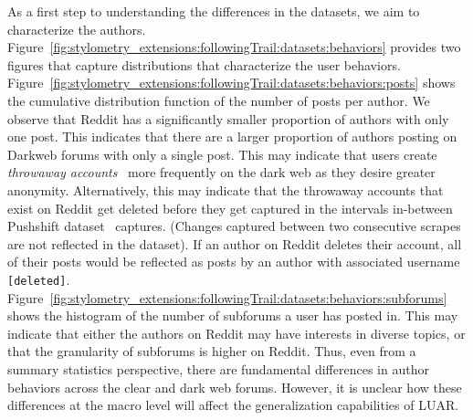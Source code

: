 As a first step to understanding the differences in the datasets, we aim to characterize the authors.
Figure~\ref{fig:stylometry_extensions:followingTrail:datasets:behaviors} provides two figures that capture distributions that characterize the user behaviors.
Figure~\ref{fig:stylometry_extensions:followingTrail:datasets:behaviors:posts} shows the cumulative distribution function of the number of posts per author.
We observe that Reddit has a significantly smaller proportion of authors with only one post.
This indicates that there are a larger proportion of authors posting on Darkweb forums with only a single post.
This may indicate that users create \textit{throwaway accounts}~\cite{leavitt2015throwaway} more frequently on the dark web as they desire greater anonymity.
Alternatively, this may indicate that the throwaway accounts that exist on Reddit get deleted before they get captured in the intervals in-between Pushshift dataset~\citep{baumgartner2020pushshift} captures.
(Changes captured between two consecutive scrapes are not reflected in the dataset).
If an author on Reddit deletes their account, all of their posts would be reflected as posts by an author with associated username \texttt{[deleted]}.
Figure~\ref{fig:stylometry_extensions:followingTrail:datasets:behaviors:subforums} shows the histogram of the number of subforums a user has posted in.
This may indicate that either the authors on Reddit may have interests in diverse topics, or that the granularity of subforums is higher on Reddit.
Thus, even from a summary statistics perspective, there are fundamental differences in author behaviors across the clear and dark web forums.
However, it is unclear how these differences at the macro level will affect the generalization capabilities of LUAR.

